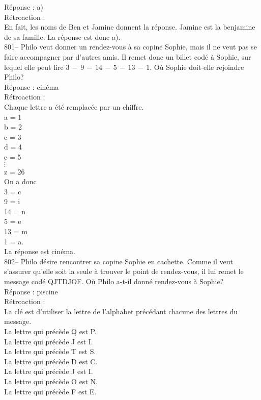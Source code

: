 ﻿\documentclass[letterpaper, 12pt]{article}
\begin{document}
R\'eponse : a)\\

R\'etroaction : \\
En fait, les noms de Ben et Jamine donnent la r\'eponse.  Jamine est la
benjamine de sa famille.  La r\'eponse est donc a).\\

801-- Philo veut donner un rendez-vous \`a sa copine Sophie, mais il ne veut
pas se faire accompagner par d'autres amis.  Il remet donc un billet cod\'e
\`a Sophie,  sur lequel elle peut lire $3\,-\,9\,-\,14\,-\,5\,-\,13\,-\,1$.
O\`u Sophie doit-elle rejoindre Philo?\\

R\'eponse : cin\'ema\\

R\'etroaction : \\
Chaque lettre a \'et\'e remplac\'ee par un chiffre. \\
a = 1\\
b = 2\\
c = 3\\
d = 4\\
e = 5\\
$\vdots$\\
z = 26\\

On a donc\\
3 = c\\
9 = i\\
14 = n\\
5 = e\\
13 = m\\
1 = a.\\

La r\'eponse est cin\'ema.\\

802-- Philo d\'esire rencontrer sa copine Sophie en cachette.  Comme il veut
s'assurer qu'elle soit la seule \`a trouver le point de rendez-vous, il lui
remet le message cod\'e QJTDJOF.  O\`u Philo a-t-il donn\'e rendez-vous \`a
Sophie?\\

R\'eponse : piscine\\

R\'etroaction : \\
La cl\'e est d'utiliser la lettre de l'alphabet pr\'ec\'edant chacune des
lettres du message.\\
La lettre qui pr\'ec\`ede Q est P.\\
La lettre qui pr\'ec\`ede J est I.\\
La lettre qui pr\'ec\`ede T est S.\\
La lettre qui pr\'ec\`ede D est C.\\
La lettre qui pr\'ec\`ede J est I.\\
La lettre qui pr\'ec\`ede O est N.\\
La lettre qui pr\'ec\`ede F est E.\\
\end{document}

